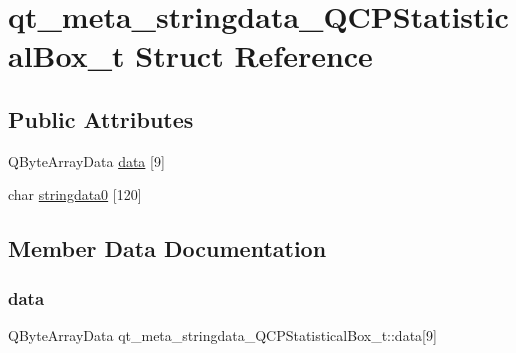 \hypertarget{structqt__meta__stringdata__QCPStatisticalBox__t}{}\section{qt\+\_\+meta\+\_\+stringdata\+\_\+\+Q\+C\+P\+Statistical\+Box\+\_\+t Struct Reference}
\label{structqt__meta__stringdata__QCPStatisticalBox__t}
\subsection*{Public Attributes}
\begin{DoxyCompactItemize}
\item 
Q\+Byte\+Array\+Data \mbox{\hyperlink{structqt__meta__stringdata__QCPStatisticalBox__t_a4da073c461b75439babf89f1a883b091}{data}} \mbox{[}9\mbox{]}
\item 
char \mbox{\hyperlink{structqt__meta__stringdata__QCPStatisticalBox__t_a1cda43a559b6896254cc1ae2ff88fe83}{stringdata0}} \mbox{[}120\mbox{]}
\end{DoxyCompactItemize}


\subsection{Member Data Documentation}
\mbox{\label{structqt__meta__stringdata__QCPStatisticalBox__t_a4da073c461b75439babf89f1a883b091}} 
\subsubsection{\texorpdfstring{data}{data}}
{\footnotesize\ttfamily Q\+Byte\+Array\+Data qt\+\_\+meta\+\_\+stringdata\+\_\+\+Q\+C\+P\+Statistical\+Box\+\_\+t\+::data\mbox{[}9\mbox{]}}

\mbox{\label{structqt__meta__stringdata__QCPStatisticalBox__t_a1cda43a559b6896254cc1ae2ff88fe83}} 
